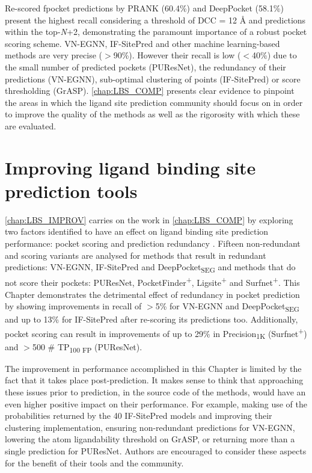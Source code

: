 Re-scored fpocket predictions by PRANK (60.4\%) and DeepPocket (58.1\%) present the highest recall considering a threshold of DCC = 12 \AA{} and predictions within the top-\textit{N}+2, demonstrating the paramount importance of a robust pocket scoring scheme. VN-EGNN, IF-SitePred and other machine learning-based methods are very precise ($>$90\%). However their recall is low ($<$40\%) due to the small number of predicted pockets (PUResNet), the redundancy of their predictions (VN-EGNN), sub-optimal clustering of points (IF-SitePred) or score thresholding (GrASP). \autoref{chap:LBS_COMP} presents clear evidence to pinpoint the areas in which the ligand site prediction community should focus on in order to improve the quality of the methods as well as the rigorosity with which these are evaluated.

\section{Improving ligand binding site prediction tools}

\autoref{chap:LBS_IMPROV} carries on the work in \autoref{chap:LBS_COMP} by exploring two factors identified to have an effect on ligand binding site prediction performance: pocket scoring and prediction redundancy \cite{UTGES_2024_LBSCOMP}. Fifteen non-redundant and scoring variants are analysed for methods that result in redundant predictions: VN-EGNN, IF-SitePred and DeepPocket\textsubscript{SEG} and methods that do not score their pockets: PUResNet, PocketFinder\textsuperscript{+}, Ligsite\textsuperscript{+} and Surfnet\textsuperscript{+}. This Chapter demonstrates the detrimental effect of redundancy in pocket prediction by showing improvements in recall of $>$5\% for VN-EGNN and DeepPocket\textsubscript{SEG} and up to 13\% for IF-SitePred after re-scoring its predictions too. Additionally, pocket scoring can result in improvements of up to 29\% in Precision\textsubscript{1K} (Surfnet\textsuperscript{+}) and $>$500 \# TP\textsubscript{100 FP} (PUResNet).

The improvement in performance accomplished in this Chapter is limited by the fact that it takes place post-prediction. It makes sense to think that approaching these issues prior to prediction, in the source code of the methods, would have an even higher positive impact on their performance. For example, making use of the probabilities returned by the 40 IF-SitePred models and improving their clustering implementation, ensuring non-redundant predictions for VN-EGNN, lowering the atom ligandability threshold on GrASP, or returning more than a single prediction for PUResNet. Authors are encouraged to consider these aspects for the benefit of their tools and the community.

